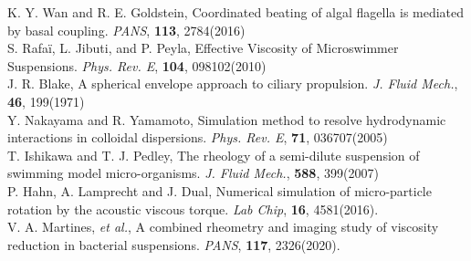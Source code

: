\documentclass[11pt, a4j, dvipdfmx]{jarticle}
\begin{document}
\renewcommand{\refname}{参考文献}

\begin{thebibliography}{99}
%
K. Y. Wan and R. E. Goldstein, Coordinated beating of algal flagella is mediated by basal coupling. \textit{PANS}, \textbf{113}, 2784(2016)\\

S. Rafa\"i, L. Jibuti, and P. Peyla, Effective Viscosity of Microswimmer Suspensions. \textit{Phys. Rev. E}, \textbf{104}, 098102(2010) \\

%
J. R. Blake, A spherical envelope approach to ciliary propulsion. \textit{J. Fluid Mech.}, \textbf{46}, 199(1971) \\

%
Y. Nakayama and R. Yamamoto, Simulation method to resolve hydrodynamic interactions in colloidal dispersions. \textit{Phys. Rev. E}, \textbf{71}, 036707(2005)\\

%
T. Ishikawa and T. J. Pedley, The rheology of a semi-dilute suspension of swimming model micro-organisms. \textit{J. Fluid Mech.}, \textbf{588}, 399(2007) \\

%
P. Hahn, A. Lamprecht and J. Dual, Numerical simulation of micro-particle rotation by the acoustic viscous torque. \textit{Lab Chip}, \textbf{16}, 4581(2016). \\

%
V. A. Martines, \textit{et al.}, A combined rheometry and imaging study of viscosity reduction in bacterial suspensions. \textit{PANS}, \textbf{117}, 2326(2020). 
\vspace{-8truemm}\\
\end{thebibliography}
\end{document}
